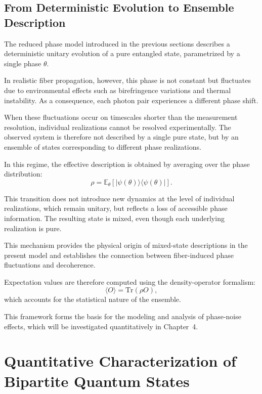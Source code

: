 \documentclass[a4paper]{article}
\begin{document}
\subsection{From Deterministic Evolution to Ensemble Description}

The reduced phase model introduced in the previous sections describes a deterministic unitary evolution of a pure entangled state, parametrized by a single phase \(\theta\).

In realistic fiber propagation, however, this phase is not constant but fluctuates due to environmental effects such as birefringence variations and thermal instability. As a consequence, each photon pair experiences a different phase shift.

When these fluctuations occur on timescales shorter than the measurement resolution, individual realizations cannot be resolved experimentally. The observed system is therefore not described by a single pure state, but by an ensemble of states corresponding to different phase realizations.

In this regime, the effective description is obtained by averaging over the phase distribution:
\[
\rho = \mathbb{E}_{\theta}\left[ |\psi(\theta)\rangle\langle \psi(\theta)| \right].
\]

This transition does not introduce new dynamics at the level of individual realizations, which remain unitary, but reflects a loss of accessible phase information. The resulting state is mixed, even though each underlying realization is pure.

This mechanism provides the physical origin of mixed-state descriptions in the present model and establishes the connection between fiber-induced phase fluctuations and decoherence.

Expectation values are therefore computed using the density-operator formalism:
\[
\langle O \rangle = \mathrm{Tr}(\rho O),
\]
which accounts for the statistical nature of the ensemble.

This framework forms the basis for the modeling and analysis of phase-noise effects, which will be investigated quantitatively in Chapter~4.
\section{Quantitative Characterization of Bipartite Quantum States}
\end{document}
